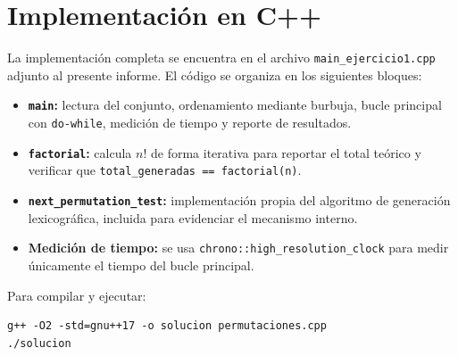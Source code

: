 \documentclass[12pt, a4paper]{article}
\begin{document}
\section{Implementación en C++}

La implementación completa se encuentra en el archivo \texttt{main\_ejercicio1.cpp}
adjunto al presente informe. El código se organiza en los siguientes bloques:

\begin{itemize}
  \item \textbf{\texttt{main}:} lectura del conjunto, ordenamiento mediante burbuja,
        bucle principal con \texttt{do-while}, medición de tiempo y reporte de resultados.
  \item \textbf{\texttt{factorial}:} calcula $n!$ de forma iterativa para reportar el
        total teórico y verificar que \texttt{total\_generadas == factorial(n)}.
  \item \textbf{\texttt{next\_permutation\_test}:} implementación propia del algoritmo
        de generación lexicográfica, incluida para evidenciar el mecanismo interno.
  \item \textbf{Medición de tiempo:} se usa \texttt{chrono::high\_resolution\_clock}
        para medir únicamente el tiempo del bucle principal.
\end{itemize}

Para compilar y ejecutar:
\begin{lstlisting}[style=pseudo]
g++ -O2 -std=gnu++17 -o solucion permutaciones.cpp
./solucion
\end{lstlisting}
\end{document}
